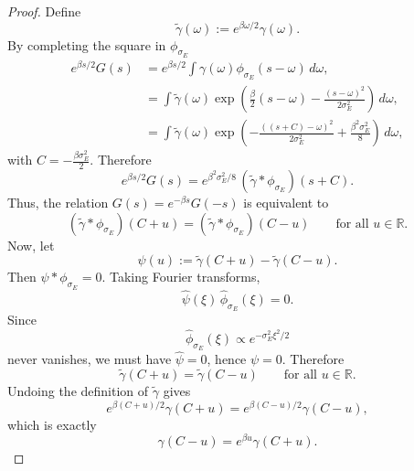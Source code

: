 \documentclass[showpacs,amsmath,amssymb,twocolumn,prx,superscriptaddress,10pt,aps,nofootinbib]{revtex4-2}
\begin{document}
\begin{proof}
Define
\begin{equation}
\widetilde\gamma(\omega):=e^{\beta\omega/2}\gamma(\omega).
\end{equation}
By completing the square in $\phi _{\sigma _E}$ 
\begin{align*}
e^{\beta s/2}G(s)&=e^{\beta s/2}\int\gamma(\omega)\phi_{\sigma_E}(s-\omega)\,d\omega,  \\
&=\int \widetilde\gamma(\omega) \exp\!\left( \frac{\beta}{2}(s-\omega)-\frac{(s-\omega)^2 }{2\sigma_E^2} \right) \,d\omega, \\
&=\int \widetilde\gamma(\omega) \exp\!\left( -\frac{((s+C)-\omega)^2}{2\sigma_E^2}
+\frac{\beta^2\sigma_E^2}{8}\right)\,d\omega,
\end{align*}
with $C=-\frac{\beta\sigma_E^2}{2}$. Therefore
\begin{equation}
e^{\beta s/2}G(s)
=
e^{\beta^2\sigma_E^2/8}\,
(\widetilde\gamma * \phi_{\sigma_E})(s+C).
\end{equation}
Thus, the relation $G(s)=e^{-\beta s}G(-s)$ is equivalent to
\begin{equation}
(\widetilde\gamma * \phi_{\sigma_E})(C+u)
=
(\widetilde\gamma * \phi_{\sigma_E})(C-u)
\qquad
\text{for all }u\in\mathbb R.
\end{equation}
Now, let
\begin{equation}
\psi(u):=\widetilde\gamma(C+u)-\widetilde\gamma(C-u).
\end{equation}
Then $\psi * \phi_{\sigma_E}=0$. Taking Fourier transforms,
\begin{equation}
\widehat{\psi}(\xi)\,\widehat{\phi}_{\sigma_E}(\xi)=0.
\end{equation}
Since
\begin{equation}
\widehat{\phi}_{\sigma_E}(\xi)\propto e^{-\sigma_E^2\xi^2/2}
\end{equation}
never vanishes, we must have $\widehat{\psi}=0$, hence $\psi=0$. Therefore
\begin{equation}
\widetilde\gamma(C+u)=\widetilde\gamma(C-u)
\qquad
\text{for all }u\in\mathbb R.
\end{equation}
Undoing the definition of $\widetilde\gamma$ gives
\begin{equation}
e^{\beta(C+u)/2}\gamma(C+u)=e^{\beta(C-u)/2}\gamma(C-u),
\end{equation}
which is exactly
\begin{equation}
\gamma(C-u)=e^{\beta u}\gamma(C+u).
\end{equation}

\end{proof}
\end{document}
